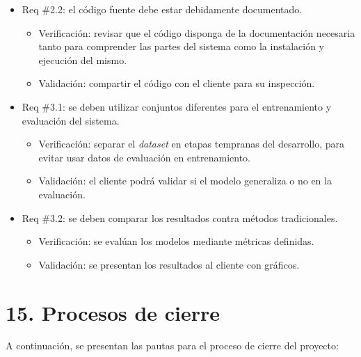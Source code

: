 \documentclass[
11pt, %
]{charter}
\begin{document}
\begin{itemize} 
\item Req \#2.2: el código fuente debe estar debidamente documentado.

\begin{itemize}
	\item Verificación: revisar que el código disponga de la documentación necesaria tanto para comprender las partes del sistema como la instalación y ejecución del mismo.
	\item Validación: compartir el código con el cliente para su inspección.
\end{itemize}

\end{itemize}

\begin{itemize} 
\item Req \#3.1: se deben utilizar conjuntos diferentes para el entrenamiento y evaluación del sistema.

\begin{itemize}
	\item Verificación: separar el \textit{dataset} en etapas tempranas del desarrollo, para evitar usar datos de evaluación en entrenamiento.
	\item Validación: el cliente podrá validar si el modelo generaliza o no en la evaluación.
\end{itemize}

\end{itemize}

\begin{itemize} 
\item Req \#3.2: se deben comparar los resultados contra métodos tradicionales.

\begin{itemize}
	\item Verificación: se evalúan los modelos mediante métricas definidas.
	\item Validación: se presentan los resultados al cliente con gráficos.
\end{itemize}

\end{itemize}


\section{15. Procesos de cierre}    
\label{sec:cierre}

A continuación, se presentan las pautas para el proceso de cierre del proyecto:
\end{document}
